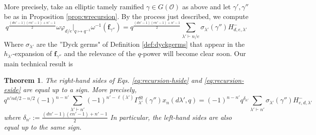 \documentclass{amsart}
\numberwithin{equation}{section}
\newtheorem{theorem}[lemma]{Theorem}%
\theoremstyle{definition}
\newcommand{\cO}{\mathcal{O}}
\begin{document}
More precisely, take an elliptic tamely ramified $\gamma\in G(\cO)$ as above and let $\gamma',\gamma''$ be as in Proposition \ref{prop:wrecursion}. By the process just described, we compute
\begin{equation}
\label{eq:recursion-eside}
q^{\frac{(dn'-1)(en'-1)+n'-1}{2}}\omega \varphi_{d/e}|_{q\mapsto q^{-1}} \omega^{-1} (\mathbf{f}_{\gamma''})=q^{\frac{(dn'-1)(en'-1)+n'-1}{2}}\sum_{\lambda'\vdash n/e} \sigma_{\lambda'}(\gamma'')
H_{d,e,\lambda'}^-
\end{equation} 
Where $\sigma_{\lambda'}$ are the ''Dyck germs" of Definition \ref{def:dyckgerms} that appear in the $h_{\lambda'}$-expansion of $\mathbf{f}_{\gamma''}$ and the relevance of the $q$-power will become clear soon. 
Our main technical result is
\begin{theorem}
\label{thm:comparerecursion}
The right-hand sides of Eqs. \eqref{eq:recursion-hside} and \eqref{eq:recursion-eside} are equal up to a sign. More precisely,
$$q^{n'n d/2-n/2}(-1)^{n-n'}\sum_{\lambda'\vdash n'} (-1)^{n'-\ell(\lambda')}\Gamma^{St}_{\lambda'}(\gamma'')x_n(d\lambda',q)=(-1)^{n-n'}q^{\delta_{n'}} \sum_{\lambda'\vdash n'} \sigma_{\lambda'}(\gamma'')H^-_{e,d,\lambda'}$$
where $\delta_{n'}:=\frac{(dn'-1)(en'-1)+n'-1}{2}$  In particular, the left-hand sides are also equal up to the same sign.

\end{theorem}
\end{document}
